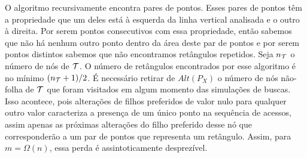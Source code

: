 O algoritmo recursivamente encontra pares de pontos. Esses pares de pontos têm a propriedade que um deles está à esquerda da linha vertical analisada e o outro à direita. Por serem pontos consecutivos com essa propriedade, então sabemos que não há nenhum outro ponto dentro da área deste par de pontos e por serem pontos distintos sabemos que não encontramos retângulos repetidos. Seja $n_{\mathcal{T}}$ o número de nós de $\mathcal{T}$. O número de retângulos encontrados por esse algoritmo é no mínimo $(n_{\mathcal{T}} + 1)/2$. É necessário retirar de $Alt(P_X)$ o número de nós não-folha de $\mathcal{T}$ que foram visitados em algum momento das simulações de buscas. Isso acontece, pois alterações de filhos preferidos de valor nulo para qualquer outro valor caracteriza a presença de um único ponto na sequência de acessos, assim apenas as próximas alterações do filho preferido desse nó que corresponderão a um par de pontos que representa um retângulo. Assim, para $m = \Omega(n)$, essa perda é assintoticamente desprezível.

